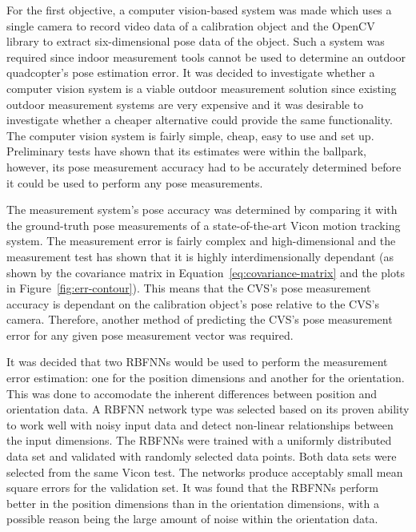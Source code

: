 For the first objective, a computer vision-based system was made which uses a single camera to record video data of a calibration object and the OpenCV library to extract six-dimensional pose data of the object. Such a system was required since indoor measurement tools cannot be used to determine an outdoor quadcopter's pose estimation error. It was decided to investigate whether a computer vision system is a viable outdoor measurement solution since existing outdoor measurement systems are very expensive and it was desirable to investigate whether a cheaper alternative could provide the same functionality. The computer vision system is fairly simple, cheap, easy to use and set up. Preliminary tests have shown that its estimates were within the ballpark, however, its pose measurement accuracy had to be accurately determined before it could be used to perform any pose measurements. 

The measurement system's pose accuracy was determined by comparing it with the ground-truth pose measurements of a state-of-the-art Vicon motion tracking system. The measurement error is fairly complex and high-dimensional and the measurement test has shown that it is highly interdimensionally dependant (as shown by the covariance matrix in Equation~\ref{eq:covariance-matrix} and the plots in Figure~\ref{fig:err-contour}). This means that the CVS's pose measurement accuracy is dependant on the calibration object's pose relative to the CVS's camera. Therefore, another method of predicting the CVS's pose measurement error for any given pose measurement vector was required.

It was decided that two RBFNNs would be used to perform the measurement error estimation: one for the position dimensions and another for the orientation. This was done to accomodate the inherent differences between position and orientation data. A RBFNN network type was selected based on its proven ability to work well with noisy input data and detect non-linear relationships between the input dimensions. The RBFNNs were trained with a uniformly distributed data set and validated with randomly selected data points. Both data sets were selected from the same Vicon test. The networks produce acceptably small mean square errors for the validation set. It was found that the RBFNNs perform better in the position dimensions than in the orientation dimensions, with a possible reason being the large amount of noise within the orientation data. 

